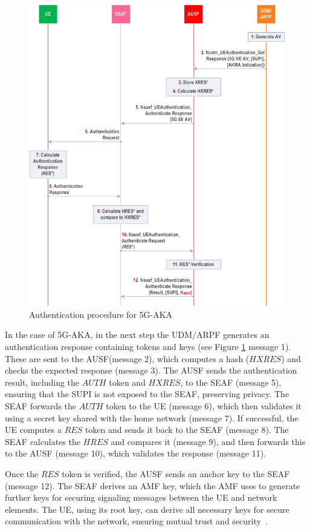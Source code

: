 \begin{figure}
    \centering
    \includegraphics[width=0.75\linewidth]{figs/Authentication procedure for 5G AKA.png}
    \caption{Authentication procedure for \acs{5G-AKA}}
    \label{fig:Authentication procedure for 5G AKA}
\end{figure}

In the case of \ac{5G-AKA}, in the next step the \ac{UDM}/\ac{ARPF} generates an authentication response containing tokens and keys (see Figure \ref{fig:Authentication procedure for 5G AKA} message 1). These are sent to the \ac{AUSF}(message 2), which computes a hash ($HXRES$) and checks the expected response (message 3). The \ac{AUSF} sends the authentication result, including the $AUTH$ token and $HXRES$, to the \ac{SEAF} (message 5), ensuring that the \ac{SUPI} is not exposed to the \ac{SEAF}, preserving privacy. The \ac{SEAF} forwards the $AUTH$ token to the \ac{UE} (message 6), which then validates it using a secret key shared with the home network (message 7). If successful, the \ac{UE} computes a $RES$ token and sends it back to the \ac{SEAF} (message 8). The \ac{SEAF} calculates the $HRES$ and compares it (message 9), and then forwards this to the \ac{AUSF} (message 10), which validates the response (message 11).

Once the $RES$ token is verified, the \ac{AUSF} sends an anchor key to the \ac{SEAF} (message 12). The \ac{SEAF} derives an \acs{AMF} key, which the \acl{AMF} uses to generate further keys for securing signaling messages between the \ac{UE} and network elements. The \ac{UE}, using its root key, can derive all necessary keys for secure communication with the network, ensuring mutual trust and security~\cite{33.501-p52}.

